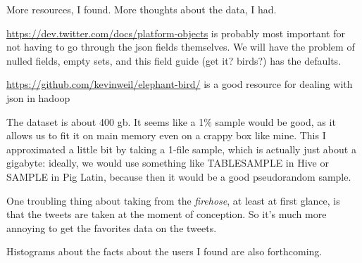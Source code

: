 More resources, I found. More thoughts about the data, I had.

\url{https://dev.twitter.com/docs/platform-objects} is probably most important for not having to go through the json fields themselves. We will have the problem of nulled fields, empty sets, and this field guide (get it? birds?) has the defaults.

\url{https://github.com/kevinweil/elephant-bird/} is a good resource for dealing with json in hadoop

The dataset is about 400 gb. It seems like a 1\% sample would be good, as it allows us to fit it on main memory even on a crappy box like mine. This I approximated a little bit by taking a 1-file sample, which is actually just about a gigabyte: ideally, we would use something like TABLESAMPLE in Hive or SAMPLE in Pig Latin, because then it would be a good pseudorandom sample.

One troubling thing about taking from the \emph{firehose}, at least at first glance, is that the tweets are taken at the moment of conception. So it's much more annoying to get the favorites data on the tweets.

Histograms about the facts about the users I found are also forthcoming.
